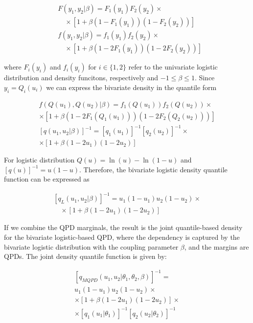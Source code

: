\documentclass[
  fleqn,
  deca,
  blindrev
]{informs4}
\begin{document}
\[
\begin{aligned}
&F(y_1,y_2\vert\beta)=F_1(y_1)F_2(y_2)\times\\
&\quad \times [1+\beta(1-F_1(y_1))(1-F_2(y_2))]\\
&f(y_1,y_2\vert\beta)=f_1(y_1)f_2(y_2)\times\\
&\quad \times [1+\beta(1-2F_1(y_1))(1-2F_2(y_2))]
\end{aligned}
\]

where \(F_i(y_i)\) and \(f_i(y_i)\) for \(i\in\{1,2\}\) refer to the
univariate logistic distribution and density funcitons, respectively and
\(-1\leq\beta\leq1\). Since \(y_i=Q_i(u_i)\) we can express the
bivariate density in the quantile form

\[
\begin{gathered}
f(Q(u_1),Q(u_2)\vert\beta)=f_1(Q(u_1))f_2(Q(u_2))\times\\
\times [1+\beta(1-2F_1(Q_1(u_1)))(1-2F_2(Q_2(u_2)))]\\
\left[q(u_1,u_2\vert\beta)\right]^{-1}=[q_1(u_1)]^{-1}[q_2(u_2)]^{-1} \times\\
\times \left[1+\beta (1-2u_1)(1-2u_2)\right]
\end{gathered}
\]

For logistic distribution \(Q(u)=\ln(u)-\ln(1-u)\) and
\([q(u)]^{-1}=u(1-u)\). Therefore, the bivariate logistic density
quantile function can be expressed as

\[
\begin{gathered}
\left[q_L(u_1,u_2\vert\beta)\right]^{-1}=u_1(1-u_1)u_2(1-u_2)\times\\
\quad\times \left[1+\beta (1-2u_1)(1-2u_2)\right]
\end{gathered}
\]

If we combine the QPD marginals, the result is the joint quantile-based
density for the bivariate logistic-based QPD, where the dependency is
captured by the bivariate logistic distribution with the coupling
parameter \(\beta\), and the margins are QPDs. The joint density
quantile function is given by:

\[
\begin{gathered}
\left[q_{MQPD}(u_1,u_2\vert\theta_1,\theta_2, \beta)\right]^{-1}=\\
u_1(1-u_1)u_2(1-u_2)\times\\
\times\left[1+\beta (1-2u_1)(1-2u_2)\right]\times\\
\times [q_1(u_1\vert\theta_1)]^{-1}[q_2(u_2\vert\theta_2)]^{-1}
\end{gathered}
\]
\end{document}
